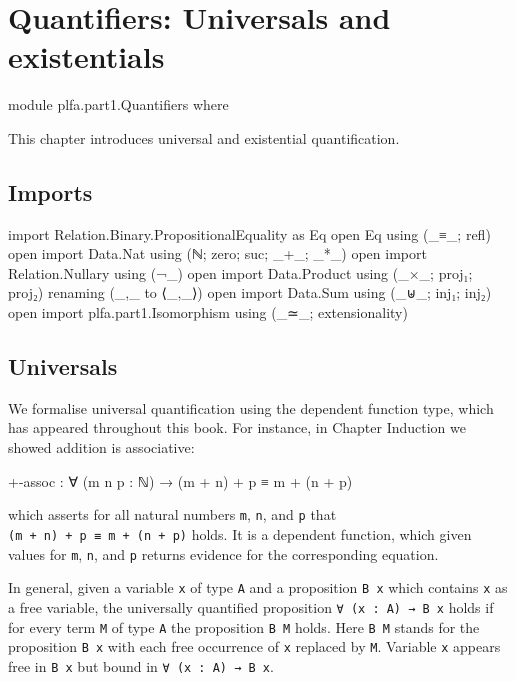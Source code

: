 \hypertarget{Quantifiers}{%
\chapter{Quantifiers: Universals and existentials}\label{Quantifiers}}

\begin{fence}
\begin{code}
module plfa.part1.Quantifiers where
\end{code}
\end{fence}

This chapter introduces universal and existential quantification.

\hypertarget{imports}{%
\section{Imports}\label{imports}}

\begin{fence}
\begin{code}
import Relation.Binary.PropositionalEquality as Eq
open Eq using (_≡_; refl)
open import Data.Nat using (ℕ; zero; suc; _+_; _*_)
open import Relation.Nullary using (¬_)
open import Data.Product using (_×_; proj₁; proj₂) renaming (_,_ to ⟨_,_⟩)
open import Data.Sum using (_⊎_; inj₁; inj₂)
open import plfa.part1.Isomorphism using (_≃_; extensionality)
\end{code}
\end{fence}

\hypertarget{universals}{%
\section{Universals}\label{universals}}

We formalise universal quantification using the dependent function type,
which has appeared throughout this book. For instance, in Chapter
Induction we showed addition is associative:

\begin{myDisplay}
+-assoc : ∀ (m n p : ℕ) → (m + n) + p ≡ m + (n + p)
\end{myDisplay}

which asserts for all natural numbers \texttt{m}, \texttt{n}, and
\texttt{p} that \texttt{(m\ +\ n)\ +\ p\ ≡\ m\ +\ (n\ +\ p)} holds. It
is a dependent function, which given values for \texttt{m}, \texttt{n},
and \texttt{p} returns evidence for the corresponding equation.

In general, given a variable \texttt{x} of type \texttt{A} and a
proposition \texttt{B\ x} which contains \texttt{x} as a free variable,
the universally quantified proposition \texttt{∀\ (x\ :\ A)\ →\ B\ x}
holds if for every term \texttt{M} of type \texttt{A} the proposition
\texttt{B\ M} holds. Here \texttt{B\ M} stands for the proposition
\texttt{B\ x} with each free occurrence of \texttt{x} replaced by
\texttt{M}. Variable \texttt{x} appears free in \texttt{B\ x} but bound
in \texttt{∀\ (x\ :\ A)\ →\ B\ x}.

